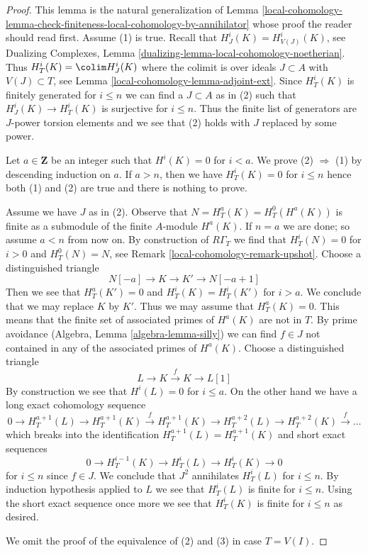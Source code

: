 \begin{proof}
This lemma is the natural generalization of
Lemma \ref{local-cohomology-lemma-check-finiteness-local-cohomology-by-annihilator}
whose proof the reader should read first.
Assume (1) is true. Recall that $H^i_J(K) = H^i_{V(J)}(K)$, see
Dualizing Complexes, Lemma \ref{dualizing-lemma-local-cohomology-noetherian}.
Thus $H^i_T(K) = \colim H^i_J(K)$ where the colimit is over ideals
$J \subset A$ with $V(J) \subset T$, see
Lemma \ref{local-cohomology-lemma-adjoint-ext}. Since $H^i_T(K)$ is finitely generated
for $i \leq n$ we can find a $J \subset A$ as in (2) such that
$H^i_J(K) \to H^i_T(K)$ is surjective for $i \leq n$.
Thus the finite list of generators are $J$-power torsion elements
and we see that (2) holds with $J$ replaced by some power.

\medskip\noindent
Let $a \in \mathbf{Z}$ be an integer such that $H^i(K) = 0$ for $i < a$.
We prove (2) $\Rightarrow$ (1) by descending induction on $a$.
If $a > n$, then we have $H^i_T(K) = 0$ for $i \leq n$ hence both
(1) and (2) are true and there is nothing to prove.

\medskip\noindent
Assume we have $J$ as in (2). Observe that $N = H^a_T(K) = H^0_T(H^a(K))$
is finite as a submodule of the finite $A$-module $H^a(K)$.
If $n = a$ we are done; so assume $a < n$ from now on. By construction of
$R\Gamma_T$ we find that $H^i_T(N) = 0$ for $i > 0$ and $H^0_T(N) = N$, see
Remark \ref{local-cohomology-remark-upshot}. Choose a distinguished triangle
$$
N[-a] \to K \to K' \to N[-a + 1]
$$
Then we see that $H^a_T(K') = 0$ and $H^i_T(K) = H^i_T(K')$ for $i > a$.
We conclude that we may replace $K$ by $K'$. Thus we may assume that
$H^a_T(K) = 0$. This means that the finite set of associated primes of
$H^a(K)$ are not in $T$. By prime avoidance
(Algebra, Lemma \ref{algebra-lemma-silly}) we can find $f \in J$
not contained in any of the associated primes of $H^a(K)$.
Choose a distinguished triangle
$$
L \to K \xrightarrow{f} K \to L[1]
$$
By construction we see that $H^i(L) = 0$ for $i \leq a$.
On the other hand we have a long exact cohomology sequence
$$
0 \to H^{a + 1}_T(L) \to H^{a + 1}_T(K) \xrightarrow{f}
H^{a + 1}_T(K) \to H^{a + 2}_T(L) \to H^{a + 2}_T(K) \xrightarrow{f} \ldots
$$
which breaks into the identification $H^{a + 1}_T(L) = H^{a + 1}_T(K)$
and short exact sequences
$$
0 \to H^{i - 1}_T(K) \to H^i_T(L) \to H^i_T(K) \to 0
$$
for $i \leq n$ since $f \in J$.
We conclude that $J^2$ annihilates $H^i_T(L)$ for $i \leq n$.
By induction hypothesis applied to $L$ we see that $H^i_T(L)$
is finite for $i \leq n$. Using the short exact sequence once more
we see that $H^i_T(K)$ is finite for $i \leq n$ as desired.

\medskip\noindent
We omit the proof of the equivalence of (2) and (3)
in case $T = V(I)$.
\end{proof}

